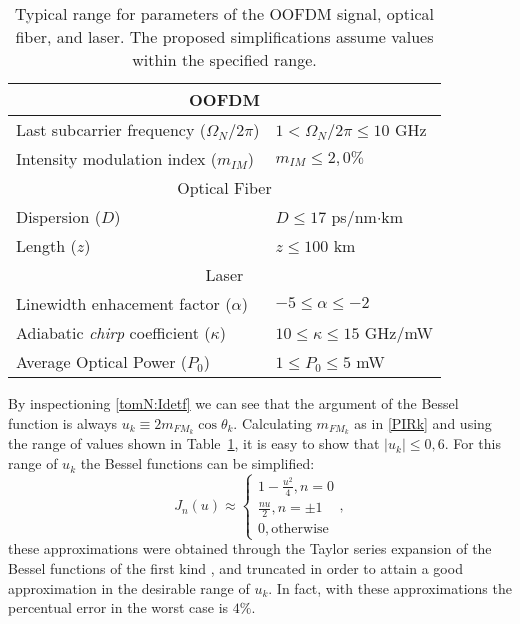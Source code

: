 \documentclass[journal]{IEEEtran}
\begin{document}
\begin{table}[h]
\centering
\begin{tabular}{l|l}
\hline
\multicolumn{2}{c}{OOFDM} \\
\cline{1-2}
\hline
Last subcarrier frequency ($\Omega_N/2\pi$)      & $ 1 < \Omega_N/2\pi \leq 10$ GHz		     \\
Intensity modulation index ($m_{IM}$)   		   & $m_{IM} \leq 2,0\%$     \\
\hline
\multicolumn{2}{c}{Optical Fiber} \\
\cline{1-2}
\hline
Dispersion ($D$)  																	 & $D \leq 17$ ps/nm$\cdot$km    \\
Length ($z$)        									  			 & $ z \leq 100$ km		     \\
\hline
\multicolumn{2}{c}{Laser} \\
\cline{1-2}
\hline
Linewidth enhacement factor ($\alpha$)&  $-5 \leq \alpha \leq -2$   \\
Adiabatic \emph{chirp} coefficient ($\kappa$)  & 	$10 \leq \kappa \leq 15$ GHz/mW     \\
Average Optical Power ($P_0$)														 &  $1 \leq P_0 \leq 5$ mW \\
\hline
\end{tabular}
\caption{Typical range for parameters of the OOFDM signal, optical fiber, and laser. The proposed simplifications assume values within the specified range.}
\label{tab:param}
\end{table}

By inspectioning \eqref{tomN:Idetf} we can see that the argument of the Bessel function is always $u_k \equiv 2m_{FM_k}\cos{\theta_k}$. Calculating $m_{FM_k}$ as in \eqref{PIRk} and using the range of values shown in Table~\ref{tab:param}, it is easy to show that $|u_k| \leq 0,6$. For this range of $u_k$ the Bessel functions can be simplified:
\begin{equation} \label{simpl-besselj}
J_n(u) \approx
\begin{cases} 
1 - \frac{u^2}{4}, n = 0 \\
\frac{nu}{2}, n = \pm 1 \\
0, \text{otherwise}
\end{cases},
\end{equation}
these approximations were obtained through the Taylor series expansion of the Bessel functions of the first kind \cite{bessel}, and truncated in order to attain a good approximation in the desirable range of $u_k$. In fact, with these approximations the percentual error in the worst case is $4\%$.
\end{document}
